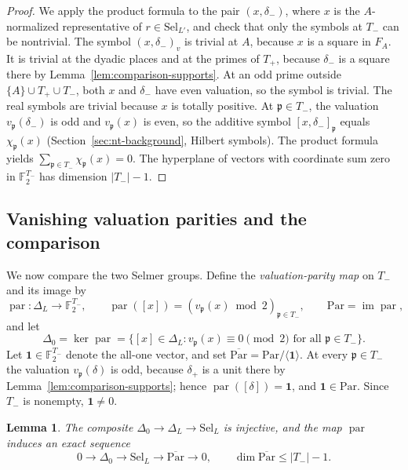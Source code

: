 \documentclass[11pt]{article}
\theoremstyle{plain}
\newtheorem{lemma}[theorem]{Lemma}
\theoremstyle{definition}
\theoremstyle{remark}
\DeclareMathOperator{\im}{im}
\newcommand{\F}{\mathbb F}
\begin{document}
\begin{proof}
We apply the product formula to the pair $(x,\delta_-)$, where $x$ is the
$A$-normalized representative of $r\in\mathrm{Sel}_{L'}$, and check that
only the symbols at $T_-$ can be nontrivial.  The symbol $(x,\delta_-)_v$
is trivial at $A$, because $x$ is a square in $F_A$.  It is trivial at the
dyadic places and at the primes of $T_+$, because $\delta_-$ is a square
there by Lemma~\ref{lem:comparison-supports}.  At an odd prime outside
$\{A\}\cup T_+\cup T_-$, both $x$ and $\delta_-$ have even valuation, so
the symbol is trivial.  The real symbols are trivial because $x$ is
totally positive.  At $\mathfrak p\in T_-$, the valuation
$v_{\mathfrak p}(\delta_-)$ is odd and $v_{\mathfrak p}(x)$ is even, so the
additive symbol $[x,\delta_-]_{\mathfrak p}$ equals $\chi_{\mathfrak p}(x)$
(Section~\ref{sec:nt-background}, Hilbert symbols).  The product formula
\cite[Chapter~V, Example~5.4]{MilneCFT} yields
$\sum_{\mathfrak p\in T_-}\chi_{\mathfrak p}(x)=0$.  The hyperplane of
vectors with coordinate sum zero in $\F_2^{T_-}$ has dimension $|T_-|-1$.
\end{proof}

\subsection{Vanishing valuation parities and the comparison}\label{sec:comparison-parities}

We now compare the two Selmer groups.  Define the
\emph{valuation-parity map} on $T_-$ and its image by
\[
 \operatorname{par}:\Delta_L\longrightarrow\F_2^{T_-},
 \qquad \operatorname{par}([x])=(v_{\mathfrak p}(x)\bmod2)_{\mathfrak p\in T_-},
 \qquad \mathrm{Par}=\im \operatorname{par},
\]
and let
\[
 \Delta_0=\ker\operatorname{par}=\{[x]\in\Delta_L:
          v_{\mathfrak p}(x)\equiv0\pmod2\text{ for all }\mathfrak p\in T_-\}.
\]
Let $\mathbf1\in\F_2^{T_-}$ denote the all-one vector, and set
$\overline{\mathrm{Par}}=\mathrm{Par}/\langle\mathbf1\rangle$.  At every
$\mathfrak p\in T_-$ the valuation $v_{\mathfrak p}(\delta)$ is odd,
because $\delta_+$ is a unit there by Lemma~\ref{lem:comparison-supports};
hence $\operatorname{par}([\delta])=\mathbf1$, and
$\mathbf1\in\mathrm{Par}$.  Since $T_-$ is nonempty, $\mathbf1\ne0$.

\begin{lemma}\label{lem:comparison-parity}
The composite $\Delta_0\to\Delta_L\to\mathrm{Sel}_L$ is injective, and the
map $\operatorname{par}$ induces an exact sequence
\begin{equation}\label{eq:comparison-pattern-sequence}
 0\longrightarrow\Delta_0\longrightarrow \mathrm{Sel}_L
       \longrightarrow\overline{\mathrm{Par}}\longrightarrow0,
 \qquad \dim\overline{\mathrm{Par}}\le|T_-|-1.
\end{equation}
\end{lemma}
\end{document}
